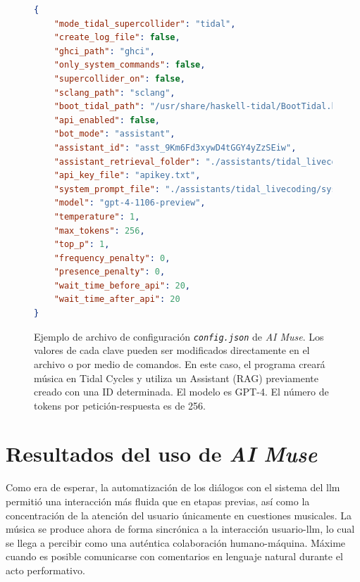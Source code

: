 \begin{figure}[H]
    \caption[Ejemplo de archivo de configuración \texttt{config.json} de \emph{AI Muse}]{Ejemplo de archivo de configuración \texttt{\emph{config.json}} de \emph{AI Muse}. Los valores de cada clave pueden ser modificados directamente en el archivo o por medio de comandos. En este caso, el programa creará música en Tidal Cycles y utiliza un Assistant (RAG) previamente creado con una ID determinada. El modelo es GPT-4. El número de tokens por petición-respuesta es de 256.}
    \centering
\begin{lstlisting}[language=json, numbers=none]
{
    "mode_tidal_supercollider": "tidal",
    "create_log_file": false,
    "ghci_path": "ghci",
    "only_system_commands": false,
    "supercollider_on": false,
    "sclang_path": "sclang",
    "boot_tidal_path": "/usr/share/haskell-tidal/BootTidal.hs",
    "api_enabled": false,
    "bot_mode": "assistant",
    "assistant_id": "asst_9Km6Fd3xywD4tGGY4yZzSEiw",
    "assistant_retrieval_folder": "./assistants/tidal_livecoding/retrieval_files/",
    "api_key_file": "apikey.txt",
    "system_prompt_file": "./assistants/tidal_livecoding/system_prompts/system_prompt_01",
    "model": "gpt-4-1106-preview",
    "temperature": 1,
    "max_tokens": 256,
    "top_p": 1,
    "frequency_penalty": 0,
    "presence_penalty": 0,
    "wait_time_before_api": 20,
    "wait_time_after_api": 20
}
\end{lstlisting}
    \source{\propio}
    \label{fig:json}
\end{figure}





\section{Resultados del uso de \emph{AI Muse}}

Como era de esperar, la automatización de los diálogos con el sistema del \gls{llm} permitió una interacción más fluida que en etapas previas, así como la concentración de la atención del usuario únicamente en cuestiones musicales. La música se produce ahora de forma sincrónica a la interacción usuario-\gls{llm}, lo cual se llega a percibir como una auténtica colaboración humano-máquina. Máxime cuando es posible comunicarse con comentarios en lenguaje natural durante el acto performativo.

